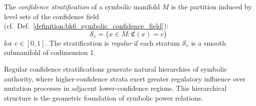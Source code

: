 \begin{definition}
\label{definition:bk6_confidence_stratification}
The \emph{confidence stratification} of a symbolic manifold $M$ is the partition induced by level sets of the confidence field (cf.~Def.~\ref{definition:bk6_symbolic_confidence_field}):
\begin{equation}
\mathcal{S}_c = \{x \in M : \mathfrak{C}(x) = c\}
\end{equation}
for $c \in [0,1]$. The stratification is \emph{regular} if each stratum $\mathcal{S}_c$ is a smooth submanifold of codimension 1.
\end{definition}

Regular confidence stratifications generate natural hierarchies of symbolic authority, where higher-confidence strata exert greater regulatory influence over mutation processes in adjacent lower-confidence regions. This hierarchical structure is the geometric foundation of symbolic power relations.

